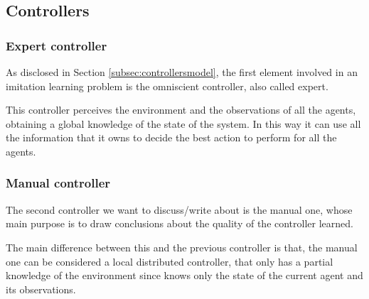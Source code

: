 \subsection{Controllers}
\label{subsec:task1controllers}

\subsubsection{Expert controller}
\label{subsubsec:omniscient}

As disclosed in Section \ref{subsec:controllersmodel}, the first element involved in 
an imitation learning problem is the omniscient controller, also called expert.

This controller perceives the environment and the observations of all the agents, 
obtaining a global knowledge of the state of the system. In this way it can use all 
the information that it owns to decide the best action to perform for all the 
agents. 



\subsubsection{Manual controller}
\label{subsubsec:manual}
The second controller we want to discuss/write about is the manual one, whose 
main purpose is to draw conclusions about the quality of the controller learned.

The main difference between this and the previous controller is that, the manual 
one can be considered a local distributed controller, that only has a partial 
knowledge of the environment since knows only the state of the current agent 
and its observations.





